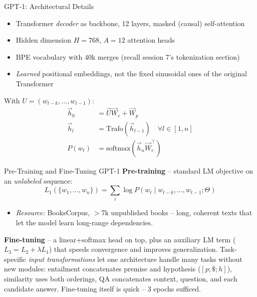 \begin{vbframe}{GPT-1: Architectural Details}
\begin{itemize}
  \item Transformer \textit{decoder} as backbone, 12 layers, masked (causal) self-attention
  \item Hidden dimension $H=768$, $A=12$ attention heads
  \item BPE vocabulary with 40k merges (recall session 7's tokenization section)
  \item \textit{Learned} positional embeddings, not the fixed sinusoidal ones of the original Transformer
\end{itemize}
With $U=(w_{t-k},\ldots,w_{t-1})$:
\begin{align*}
  \vec h_0 &= \vec U \vec W_e + \vec W_p \\
  \vec h_l &= \text{Trafo}(\vec h_{l-1}) \quad \forall l \in [1,n]\\
  P(w_t) &= \text{softmax}(\vec h_n \vec W_e^\top)
\end{align*}
\end{vbframe}

\begin{vbframe}{Pre-Training and Fine-Tuning GPT-1}
\textbf{Pre-training} -- standard LM objective on an \textit{unlabeled} sequence:
$$L_1(\{w_1,\ldots,w_n\}) = \sum_i \log P(w_t \mid w_{t-k},\ldots,w_{t-1};\Theta)$$
\begin{itemize}
  \item \textit{Resource:} BooksCorpus, $>$7k unpublished books -- long, coherent texts that let the model learn long-range dependencies.
\end{itemize}
\textbf{Fine-tuning} -- a linear+softmax head on top, plus an auxiliary LM term ($L_3 = L_2 + \lambda L_1$) that speeds convergence and improves generalization. Task-specific \textit{input transformations} let one architecture handle many tasks without new modules: entailment concatenates premise and hypothesis ($[p;\$;h]$), similarity uses both orderings, QA concatenates context, question, and each candidate answer. Fine-tuning itself is quick -- 3 epochs sufficed.
\end{vbframe}

